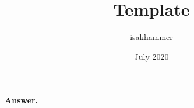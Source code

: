 \documentclass{article}
\title{Template}
\author{isakhammer }
\date{July 2020}
\theoremstyle{definition}
\theoremstyle{remark}
\begin{document}
\begin{tcolorbox}
  \textbf{Answer.} 
\end{tcolorbox}
\maketitle







\end{document}
